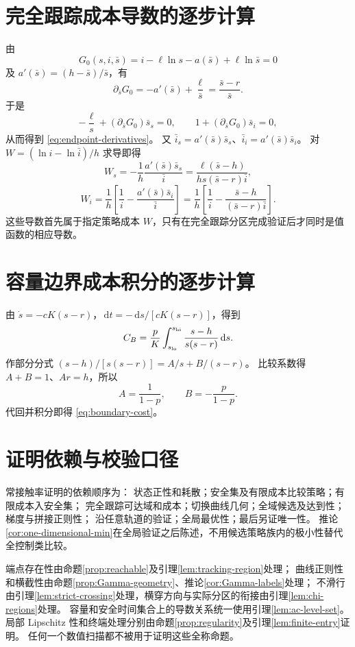 \documentclass[11pt,a4paper,UTF8]{ctexart}
\theoremstyle{definition}
\newcommand{\dd}{\,\mathrm d}
\begin{document}
\appendix
\section{完全跟踪成本导数的逐步计算}
\label{app:W-derivatives}
由
\[
G_0(s,i,\bar s)=i-\ell\ln s-a(\bar s)+\ell\ln\bar s=0
\]
及 $a'(\bar s)=(h-\bar s)/\bar s$，有
\[
\partial_{\bar s}G_0=-a'(\bar s)+\frac\ell{\bar s}
=\frac{\bar s-r}{\bar s}.
\]
于是
\[
-\frac\ell s+(\partial_{\bar s}G_0)\bar s_s=0,\qquad
1+(\partial_{\bar s}G_0)\bar s_i=0,
\]
从而得到 \eqref{eq:endpoint-derivatives}。
又 $\bar i_s=a'(\bar s)\bar s_s$、$\bar i_i=a'(\bar s)\bar s_i$。
对 $W=(\ln i-\ln\bar i)/h$ 求导即得
\[
W_s=-\frac1h\frac{a'(\bar s)\bar s_s}{\bar i}
=\frac{\ell(\bar s-h)}{hs(\bar s-r)\bar i},
\]
\[
W_i=\frac1h\left[\frac1i-\frac{a'(\bar s)\bar s_i}{\bar i}\right]
=\frac1h\left[\frac1i-\frac{\bar s-h}{(\bar s-r)\bar i}\right].
\]
这些导数首先属于指定策略成本 $W$，只有在完全跟踪分区完成验证后才同时是值函数的相应导数。

\section{容量边界成本积分的逐步计算}
\label{app:capacity-integral}
由 $\dot s=-cK(s-r)$，$\dd t=-\dd s/[cK(s-r)]$，得到
\[
C_B=\frac pK\int_{s_{\rm lo}}^{s_{\rm hi}}\frac{s-h}{s(s-r)}\dd s.
\]
作部分分式 $(s-h)/[s(s-r)]=A/s+B/(s-r)$。
比较系数得 $A+B=1$、$Ar=h$，所以
\[
A=\frac1{1-p},\qquad B=-\frac p{1-p}.
\]
代回并积分即得 \eqref{eq:boundary-cost}。

\section{证明依赖与校验口径}
\label{app:proof-scope}
常接触率证明的依赖顺序为：
状态正性和耗散；安全集及有限成本比较策略；有限成本入安全集；
完全跟踪可达域和成本；切换曲线几何；全域候选及达到性；梯度与拼接正则性；
沿任意轨道的验证；全局最优性；最后另证唯一性。
推论\ref{cor:one-dimensional-min}在全局验证之后陈述，不用候选策略族内的极小性替代全控制类比较。

端点存在性由命题\ref{prop:reachable}及引理\ref{lem:tracking-region}处理；
曲线正则性和横截性由命题\ref{prop:Gamma-geometry}、推论\ref{cor:Gamma-labels}处理；
不滑行由引理\ref{lem:strict-crossing}处理，横穿方向与实际分区的衔接由引理\ref{lem:chi-regions}处理。
容量和安全时间集合上的导数关系统一使用引理\ref{lem:ac-level-set}。
局部 Lipschitz 性和终端处理分别由命题\ref{prop:regularity}及引理\ref{lem:finite-entry}证明。
任何一个数值扫描都不被用于证明这些全称命题。
\end{document}
